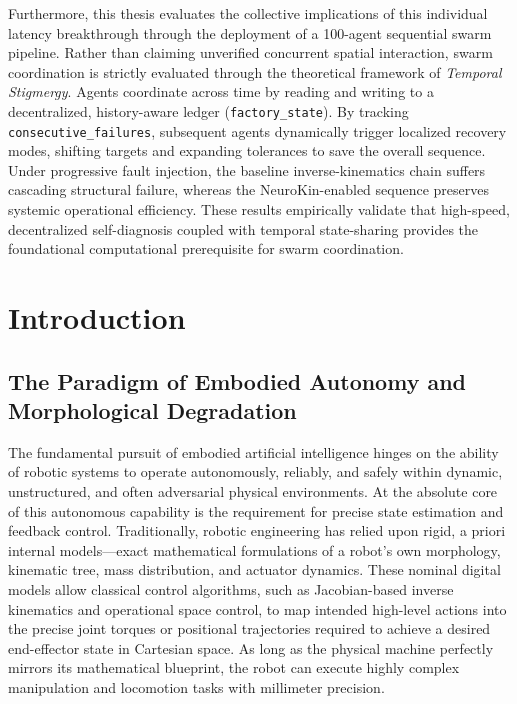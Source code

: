 \documentclass[12pt,a4paper,oneside]{report}
\begin{document}
Furthermore, this thesis evaluates the collective implications of this individual latency breakthrough through the deployment of a 100-agent sequential swarm pipeline. Rather than claiming unverified concurrent spatial interaction, swarm coordination is strictly evaluated through the theoretical framework of \textit{Temporal Stigmergy}. Agents coordinate across time by reading and writing to a decentralized, history-aware ledger (\texttt{factory\_state}). By tracking \texttt{consecutive\_failures}, subsequent agents dynamically trigger localized recovery modes, shifting targets and expanding tolerances to save the overall sequence. Under progressive fault injection, the baseline inverse-kinematics chain suffers cascading structural failure, whereas the NeuroKin-enabled sequence preserves systemic operational efficiency. These results empirically validate that high-speed, decentralized self-diagnosis coupled with temporal state-sharing provides the foundational computational prerequisite for swarm coordination.

\clearpage

\tableofcontents
\clearpage
\listoffigures
{}
\clearpage
\listoftables
{}
\clearpage


\chapter{Introduction}

\section{The Paradigm of Embodied Autonomy and Morphological Degradation}

The fundamental pursuit of embodied artificial intelligence hinges on the ability of robotic systems to operate autonomously, reliably, and safely within dynamic, unstructured, and often adversarial physical environments. At the absolute core of this autonomous capability is the requirement for precise state estimation and feedback control. Traditionally, robotic engineering has relied upon rigid, a priori internal models—exact mathematical formulations of a robot's own morphology, kinematic tree, mass distribution, and actuator dynamics. These nominal digital models allow classical control algorithms, such as Jacobian-based inverse kinematics and operational space control, to map intended high-level actions into the precise joint torques or positional trajectories required to achieve a desired end-effector state in Cartesian space. As long as the physical machine perfectly mirrors its mathematical blueprint, the robot can execute highly complex manipulation and locomotion tasks with millimeter precision.
\end{document}
